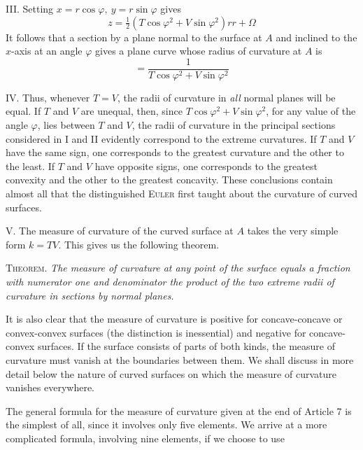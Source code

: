 \par\indent{}%
III. Setting \(x=r\cos\varphi,\ y=r\sin\varphi\) gives
\[
z=\tfrac{1}{2}(T\cos\varphi^2+V\sin\varphi^2)rr+\Omega
\]
It follows that a section by a plane normal to the surface at \(A\) and inclined to the \(x\)-axis at an angle \(\varphi\) gives a plane curve whose radius of curvature at \(A\) is
\[
=\frac{1}{T\cos\varphi^2+V\sin\varphi^2}
\]
\par\indent IV. Thus, whenever \(T=V\), the radii of curvature in \textit{all} normal planes will be equal. If \(T\) and \(V\) are unequal, then, since \(T\cos\varphi^2+V\sin\varphi^2\), for any value of the angle \(\varphi\), lies between \(T\) and \(V\), the radii of curvature in the principal sections considered in I and II evidently correspond to the extreme curvatures. If \(T\) and \(V\) have the same sign, one corresponds to the greatest curvature and the other to the least. If \(T\) and \(V\) have opposite signs, one corresponds to the greatest convexity and the other to the greatest concavity. These conclusions contain almost all that the distinguished \textsc{Euler} first taught about the curvature of curved surfaces.

V. The measure of curvature of the curved surface at \(A\) takes the very simple form \(k=TV\). This gives us the following theorem.

\textsc{Theorem.} \textit{The measure of curvature at any point of the surface equals a fraction with numerator one and denominator the product of the two extreme radii of curvature in sections by normal planes.}

It is also clear that the measure of curvature is positive for concave-concave or convex-convex surfaces (the distinction is inessential) and negative for concave-convex surfaces. If the surface consists of parts of both kinds, the measure of curvature must vanish at the boundaries between them. We shall discuss in more detail below the nature of curved surfaces on which the measure of curvature vanishes everywhere.

The general formula for the measure of curvature given at the end of Article 7 is the simplest of all, since it involves only five elements. We arrive at a more complicated formula, involving nine elements, if we choose to use
